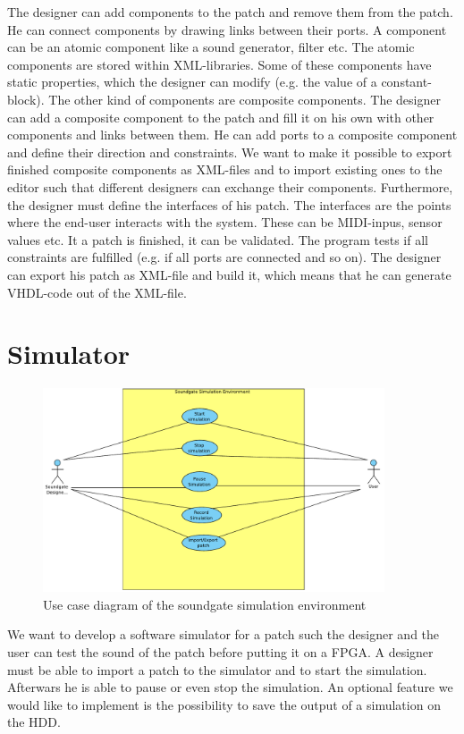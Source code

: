 The designer can add components to the patch and remove them from the patch. He can connect components by drawing links between their ports. A component can be an atomic component like a sound generator, filter etc. The atomic components are stored within XML-libraries. Some of these components have static properties, which the designer can modify (e.g. the value of a constant-block). The other kind of components are composite components. The designer can add a composite component to the patch and fill it on his own with other components and links between them. He can add ports to a composite component and define their direction and constraints. We want to make it possible to export finished composite components as XML-files and to import existing ones to the editor such that different designers can exchange their components.
Furthermore, the designer must define the interfaces of his patch. The interfaces are the points where the end-user interacts with the system. These can be MIDI-inpus, sensor values etc.
It a patch is finished, it can be validated. The program tests if all constraints are fulfilled (e.g. if all ports are connected and so on). The designer can export his patch as XML-file and build it, which means that he can generate VHDL-code out of the XML-file. 

\section{Simulator}

	\begin{figure}[!h]
		\centering
			\includegraphics[width=0.90\textwidth]{images/Soundgate_Simulator.pdf}
		\caption{Use case diagram of the soundgate simulation environment}
		\label{fig:Soundgate_Simulator}
	\end{figure}

We want to develop a software simulator for a patch such the designer and the user can test the sound of the patch before putting it on a FPGA. A designer must be able to import a patch to the simulator and to start the simulation. Afterwars he is able to pause or even stop the simulation. An optional feature we would like to implement is the possibility to save the output of a simulation on the HDD.

